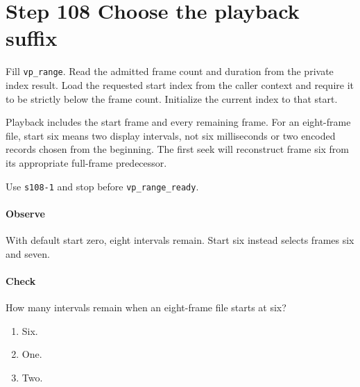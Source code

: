 \section{Step 108 Choose the playback suffix}
Fill \texttt{vp\_range}. Read the admitted frame count and duration from the private index result. Load the requested start index from the caller context and require it to be strictly below the frame count. Initialize the current index to that start.

Playback includes the start frame and every remaining frame. For an eight-frame file, start six means two display intervals, not six milliseconds or two encoded records chosen from the beginning. The first seek will reconstruct frame six from its appropriate full-frame predecessor.

Use \texttt{s108-1} and stop before \texttt{vp\_range\_ready}.

\paragraph{Observe} With default start zero, eight intervals remain. Start six instead selects frames six and seven.

\paragraph{Check} How many intervals remain when an eight-frame file starts at six?
\begin{enumerate}[label=\Alph*.]
  \item Six.
  \item One.
  \item Two.
\end{enumerate}
